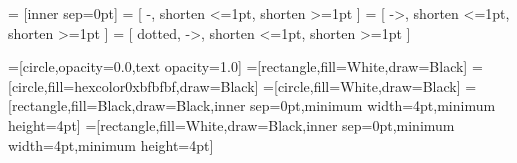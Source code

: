\usepackage{tikz}

\usetikzlibrary{bayesnet}



\tikzset{>=latex}
   = [inner sep=0pt]
  = [ -, shorten <=1pt, shorten >=1pt ]
  = [ ->, shorten <=1pt, shorten >=1pt ]
 = [ dotted, ->, shorten <=1pt, shorten >=1pt ]

=[circle,opacity=0.0,text opacity=1.0]
=[rectangle,fill=White,draw=Black]
=[circle,fill=hexcolor0xbfbfbf,draw=Black]
=[circle,fill=White,draw=Black]
=[rectangle,fill=Black,draw=Black,inner sep=0pt,minimum width=4pt,minimum height=4pt]
=[rectangle,fill=White,draw=Black,inner sep=0pt,minimum
width=4pt,minimum height=4pt]

\usepackage{pgfplots}                               %
\pgfplotsset{compat=newest}
\pgfplotsset{plot coordinates/math parser=false}
\newlength\figureheight
\newlength\figurewidth
\setlength\figureheight{2.0in}
\setlength\figurewidth{3.25in}
